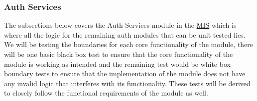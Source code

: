 \documentclass[12pt, titlepage]{article}
\begin{document}
	\subsubsection{Auth Services}
	
	The subsections below covers the Auth Services module in the \href{https://github.com/RutheniumVI/UnderTree/blob/main/docs/Design/MIS/MIS.pdf}{MIS} which is where all the logic for the remaining auth modules that can be unit tested lies. We will be testing the boundaries for each core functionality of the module, there will be one basic black box test to ensure that the core functionality of the module is working as intended and the remaining test would be white box boundary tests to ensure that the implementation of the module does not have any invalid logic that interferes with its functionality. These tests will be derived to closely follow the functional requirements of the module as well.
	
\end{document}
